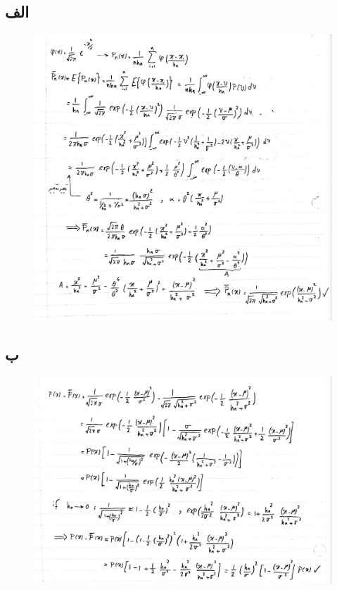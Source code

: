 \documentclass[12pt,onecolumn,a4paper]{article}
\begin{document}
\subsection*{الف}
\begin{figure}[h!]
    \begin{center}
    \includegraphics[width=\linewidth]{hand_written/31.jpg}
    \end{center}
\end{figure}
\newpage

\subsection*{ب}
\begin{figure}[h!]
    \begin{center}
    \includegraphics[width=\linewidth]{hand_written/32.jpg}
    \end{center}
\end{figure}
\newpage
\end{document}
